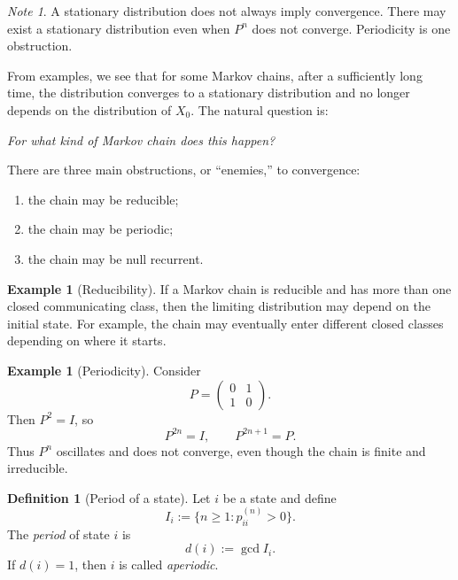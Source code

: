 \documentclass[11pt]{article}
\theoremstyle{plain}
\theoremstyle{definition}
\newtheorem{definition}[theorem]{Definition}
\newtheorem{example}[theorem]{Example}
\theoremstyle{remark}
\newtheorem{note}[theorem]{Note}
\begin{document}
	\begin{note}
		A stationary distribution does not always imply convergence. There may exist a stationary distribution even when \(P^n\) does not converge. Periodicity is one obstruction.
	\end{note}
	
	
	
	
	
	From examples, we see that for some Markov chains, after a sufficiently long time, the distribution converges to a stationary distribution and no longer depends on the distribution of \(X_0\). The natural question is:
	
	\begin{center}
		\emph{For what kind of Markov chain does this happen?}
	\end{center}
	
	There are three main obstructions, or ``enemies,'' to convergence:
	
	\begin{enumerate}
		\item the chain may be reducible;
		\item the chain may be periodic;
		\item the chain may be null recurrent.
	\end{enumerate}
	
	\begin{example}[Reducibility]
		If a Markov chain is reducible and has more than one closed communicating class, then the limiting distribution may depend on the initial state. For example, the chain may eventually enter different closed classes depending on where it starts.
	\end{example}
	
	\begin{example}[Periodicity]
		Consider
		\[
		P=
		\begin{pmatrix}
			0 & 1\\
			1 & 0
		\end{pmatrix}.
		\]
		Then \(P^2=I\), so
		\[
		P^{2n}=I,
		\qquad
		P^{2n+1}=P.
		\]
		Thus \(P^n\) oscillates and does not converge, even though the chain is finite and irreducible.
	\end{example}
	
	
	
	
	\begin{definition}[Period of a state]
		Let \(i\) be a state and define
		\[
		I_i:=\{n\ge 1:p_{ii}^{(n)}>0\}.
		\]
		The \emph{period} of state \(i\) is
		\[
		d(i):=\gcd I_i.
		\]
		If \(d(i)=1\), then \(i\) is called \emph{aperiodic}.
	\end{definition}
	
\end{document}
